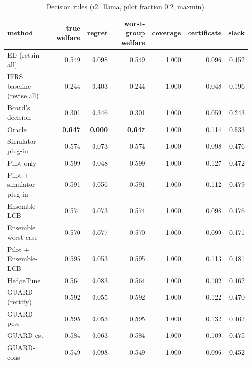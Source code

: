 \begin{table}[t]
\centering
\small
\begin{tabular}{lrrrrrr}
\toprule
method & true welfare & regret & worst-group welfare & coverage & certificate & slack \\
\midrule
ED (retain all) & 0.549 & 0.098 & 0.549 & 1.000 & 0.096 & 0.452 \\
IFRS baseline (revise all) & 0.244 & 0.403 & 0.244 & 1.000 & 0.048 & 0.196 \\
Board's decision & 0.301 & 0.346 & 0.301 & 1.000 & 0.059 & 0.243 \\
Oracle & \textbf{0.647} & \textbf{0.000} & \textbf{0.647} & 1.000 & 0.114 & 0.533 \\
Simulator plug-in & 0.574 & 0.073 & 0.574 & 1.000 & 0.098 & 0.476 \\
Pilot only & 0.599 & 0.048 & 0.599 & 1.000 & 0.127 & 0.472 \\
Pilot + simulator plug-in & 0.591 & 0.056 & 0.591 & 1.000 & 0.112 & 0.479 \\
Ensemble-LCB & 0.574 & 0.073 & 0.574 & 1.000 & 0.098 & 0.476 \\
Ensemble worst case & 0.570 & 0.077 & 0.570 & 1.000 & 0.099 & 0.471 \\
Pilot + Ensemble-LCB & 0.595 & 0.053 & 0.595 & 1.000 & 0.113 & 0.481 \\
HedgeTune & 0.564 & 0.083 & 0.564 & 1.000 & 0.102 & 0.462 \\
GUARD (rectify) & 0.592 & 0.055 & 0.592 & 1.000 & 0.122 & 0.470 \\
GUARD-pess & 0.595 & 0.053 & 0.595 & 1.000 & 0.132 & 0.462 \\
GUARD-est & 0.584 & 0.063 & 0.584 & 1.000 & 0.109 & 0.475 \\
GUARD-cons & 0.549 & 0.098 & 0.549 & 1.000 & 0.096 & 0.452 \\
\bottomrule
\end{tabular}
\caption{Decision rules (r2\_llama, pilot fraction 0.2, maxmin).}
\label{tab:methods-maxmin}
\end{table}
